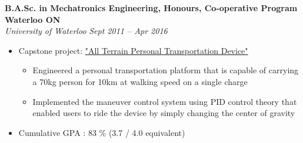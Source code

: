     \textbf{B.A.Sc. in Mechatronics Engineering, Honours, Co-operative Program}
    \hfill
    \textbf{Waterloo ON}\\
    \textit{University of Waterloo}
    \hfill
    \textit{Sept 2011 -- Apr 2016}
    \begin{itemize}
        \item Capstone project: \href{https://youtu.be/OwfrKlr_Zhk}{"All Terrain Personal Transportation Device"}
        \begin{itemize}
           \item Engineered a personal transportation platform that is capable of carrying a 70kg person for 10km at walking speed on a single charge
           \item Implemented the maneuver control system using PID control theory that enabled users to ride the device by simply changing the center of gravity
        \end{itemize}
        \item Cumulative GPA : 83 \% (3.7 / 4.0 equivalent)
    \end{itemize}
